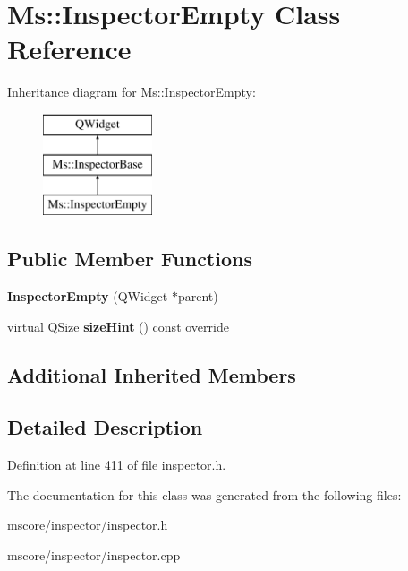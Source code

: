 \hypertarget{class_ms_1_1_inspector_empty}{}\section{Ms\+:\+:Inspector\+Empty Class Reference}
\label{class_ms_1_1_inspector_empty}
Inheritance diagram for Ms\+:\+:Inspector\+Empty\+:\begin{figure}[H]
\begin{center}
\leavevmode
\includegraphics[height=3.000000cm]{class_ms_1_1_inspector_empty}
\end{center}
\end{figure}
\subsection*{Public Member Functions}
\begin{DoxyCompactItemize}
\item 
\mbox{\label{class_ms_1_1_inspector_empty_afc5cc1c83553d27ac0b931344ab5edae}} 
{\bfseries Inspector\+Empty} (Q\+Widget $\ast$parent)
\item 
\mbox{\label{class_ms_1_1_inspector_empty_a411ae2edd8d7c3213c42a4effecc3e69}} 
virtual Q\+Size {\bfseries size\+Hint} () const override
\end{DoxyCompactItemize}
\subsection*{Additional Inherited Members}


\subsection{Detailed Description}


Definition at line 411 of file inspector.\+h.



The documentation for this class was generated from the following files\+:\begin{DoxyCompactItemize}
\item 
mscore/inspector/inspector.\+h\item 
mscore/inspector/inspector.\+cpp\end{DoxyCompactItemize}
